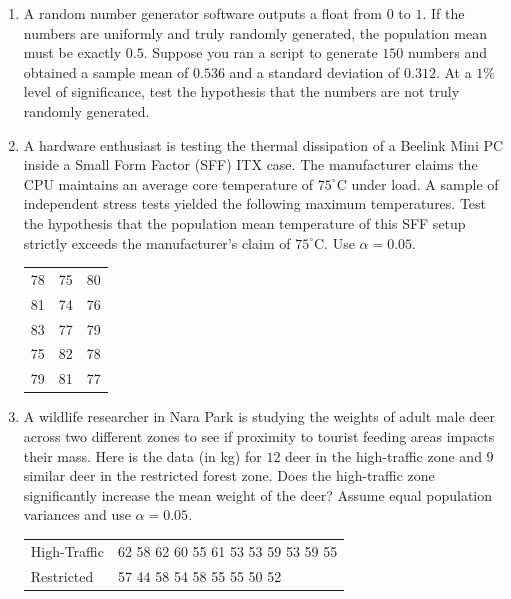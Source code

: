 \documentclass{article}
\begin{document}
\begin{enumerate}
    \item A random number generator software outputs a float from $0$ to $1$. If the numbers are uniformly and truly randomly generated, the population mean must be exactly $0.5$. Suppose you ran a script to generate $150$ numbers and obtained a sample mean of $0.536$ and a standard deviation of $0.312$. At a $1\%$ level of significance, test the hypothesis that the numbers are not truly randomly generated.

    \item A hardware enthusiast is testing the thermal dissipation of a Beelink Mini PC inside a Small Form Factor (SFF) ITX case. The manufacturer claims the CPU maintains an average core temperature of $75^\circ\text{C}$ under load. A sample of independent stress tests yielded the following maximum temperatures. Test the hypothesis that the population mean temperature of this SFF setup strictly exceeds the manufacturer's claim of $75^\circ\text{C}$. Use $\alpha = 0.05$.
    \begin{table}[h]
    \centering
    \begin{tabular}{rrr}
    78 & 75 & 80 \\
    81 & 74 & 76 \\
    83 & 77 & 79 \\
    75 & 82 & 78 \\
    79 & 81 & 77
    \end{tabular}
    \end{table}

    \item A wildlife researcher in Nara Park is studying the weights of adult male deer across two different zones to see if proximity to tourist feeding areas impacts their mass. Here is the data (in kg) for $12$ deer in the high-traffic zone and $9$ similar deer in the restricted forest zone. Does the high-traffic zone significantly increase the mean weight of the deer? Assume equal population variances and use $\alpha = 0.05$.
    \begin{table}[h]
    \centering
    \begin{tabular}{ll}
    High-Traffic & 62 58 62 60 55 61 53 53 59 53 59 55 \\
    Restricted & 57 44 58 54 58 55 55 50 52
    \end{tabular}
    \end{table}


\end{enumerate}
\end{document}
